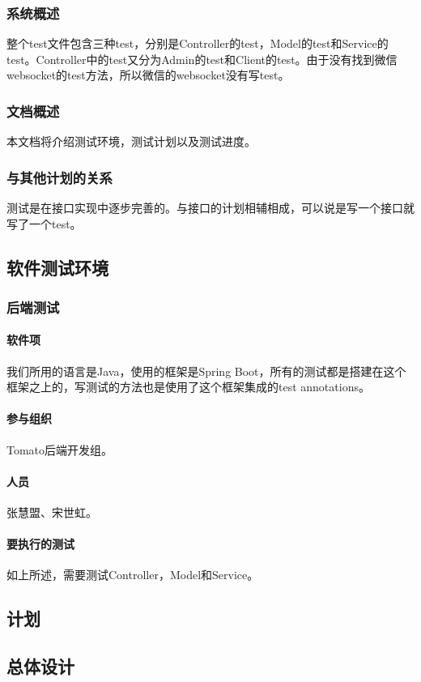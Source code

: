 \documentclass{article}
\begin{document}
			\subsubsection{系统概述}
				整个test文件包含三种test，分别是Controller的test，Model的test和Service的test。Controller中的test又分为Admin的test和Client的test。由于没有找到微信websocket的test方法，所以微信的websocket没有写test。
			\subsubsection{文档概述}
				本文档将介绍测试环境，测试计划以及测试进度。
			\subsubsection{与其他计划的关系}
				测试是在接口实现中逐步完善的。与接口的计划相辅相成，可以说是写一个接口就写了一个test。
		\subsection{软件测试环境}
			\subsubsection{后端测试}
				\paragraph{软件项}
					我们所用的语言是Java，使用的框架是Spring Boot，所有的测试都是搭建在这个框架之上的，写测试的方法也是使用了这个框架集成的test annotations。
				\paragraph{参与组织}
					Tomato后端开发组。
				\paragraph{人员}
					张慧盟、宋世虹。
				\paragraph{要执行的测试}
					如上所述，需要测试Controller，Model和Service。
		\subsection{计划}
			\subsection{总体设计}
\end{document}
